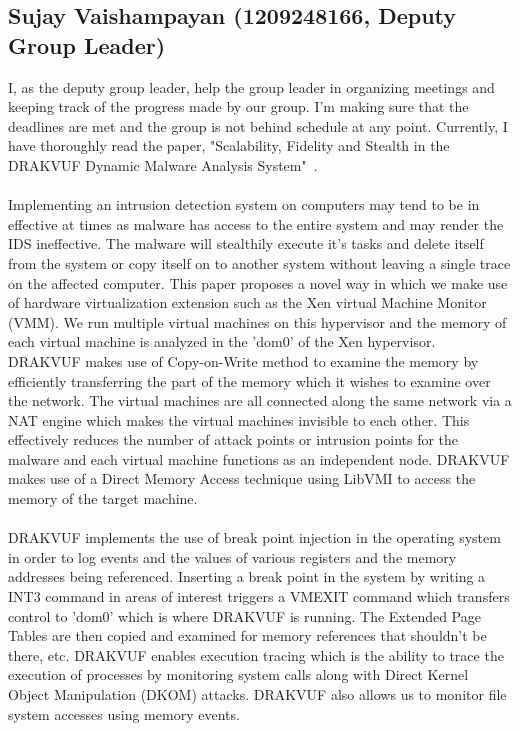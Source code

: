 \documentclass[16pt]{article}
\begin{document}
		\subsection{Sujay Vaishampayan (1209248166, Deputy Group Leader)}
		I, as the deputy group leader, help the group leader in organizing meetings and keeping track of the progress made by our group. I'm making sure that the deadlines are met and the group is not behind schedule at any point. Currently, I have thoroughly read the paper, "Scalability, Fidelity and Stealth in the DRAKVUF Dynamic Malware Analysis System"~\cite{lengyel2014scalability}. \\ \\
		Implementing an intrusion detection system on computers may tend to be in effective at times as malware has access to the entire system and may render the IDS ineffective. The malware will stealthily execute it's tasks and delete itself from the system or copy itself on to another system without leaving a single trace on the affected computer. This paper proposes a novel way in which we make use of hardware virtualization extension such as the Xen virtual Machine Monitor (VMM). We run multiple virtual machines on this hypervisor and the memory of each virtual machine is analyzed in the 'dom0' of the Xen hypervisor. DRAKVUF makes use of Copy-on-Write method to examine the memory by efficiently transferring the part of the memory which it wishes to examine over the network. The virtual machines are all connected along the same network via a NAT engine which makes the virtual machines invisible to each other. This effectively reduces the number of attack points or intrusion points for the malware and each virtual machine functions as an independent node. DRAKVUF makes use of a Direct Memory Access technique using LibVMI to access the memory of the target machine.\\ \\
		DRAKVUF implements the use of break point injection in the operating system in order to log events and the values of various registers and the memory addresses being referenced. Inserting a break point in the system by writing a INT3 command in areas of interest triggers a VMEXIT command which transfers control to 'dom0' which is where DRAKVUF is running. The Extended Page Tables are then copied and examined for memory references that shouldn't be there, etc. DRAKVUF enables execution tracing which is the ability to trace the execution of processes by monitoring system calls along with Direct Kernel Object Manipulation (DKOM) attacks. DRAKVUF also allows us to monitor file system accesses using memory events.\\  \\
\end{document}

